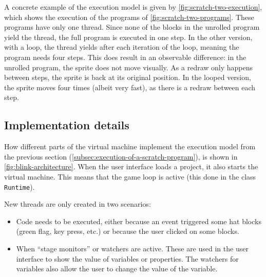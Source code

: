 \documentclass[../main]{subfiles}
\begin{document}
A concrete example of the execution model is given by \cref{fig:scratch-two-execution}, which shows the execution of the programs of \cref{fig:scratch-two-programs}.
These programs have only one thread.
Since none of the blocks in the unrolled program yield the thread, the full program is executed in one step.
In the other version, with a loop, the thread yields after each iteration of the loop, meaning the program needs four steps.
This does result in an observable difference: in the unrolled program, the sprite does not move visually.
As a redraw only happens between steps, the sprite is back at its original position.
In the looped version, the sprite moves four times (albeit very fast), as there is a redraw between each step.

\subsection{Implementation details}\label{subsec:implementation-details}

How different parts of the virtual machine implement the execution model from the previous section (\cref{subsec:execution-of-a-scratch-program}), is shown in \cref{fig:blink-architecture}.
When the user interface loads a project, it also starts the virtual machine.
This means that the game loop is active (this done in the class \texttt{Runtime}).

New threads are only created in two scenarios:
\begin{itemize}[noitemsep]
    \item Code needs to be executed, either because an event triggered some hat blocks (green flag, key press, etc.) or because the user clicked on some blocks.
    \item When ``stage monitors'' or watchers are active. These are used in the user interface to show the value of variables or properties. The watchers for variables also allow the user to change the value of the variable.
\end{itemize}
\end{document}
